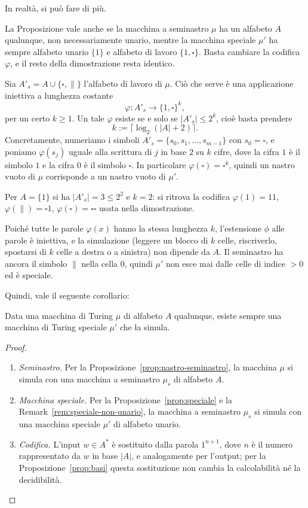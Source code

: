 In realtà, si può fare di più.

\begin{rema}\label{rem:speciale-non-unario}
La Proposizione vale anche se la macchina a seminastro $\mu$ ha un alfabeto $A$ qualunque, non necessariamente unario, mentre la macchina speciale $\mu'$ ha sempre alfabeto unario $\{1\}$ e alfabeto di lavoro $\{1,\square\}$. Basta cambiare la codifica $\varphi$, e il resto della dimostrazione resta identico.

Sia $A'_s=A\cup\{\square,\|\}$ l'alfabeto di lavoro di $\mu$. Ciò che serve è una applicazione iniettiva a lunghezza costante
\[
\varphi:A'_s\to\{1,\square\}^k ,
\]
per un certo $k\geq 1$. Un tale $\varphi$ esiste se e solo se $|A'_s|\leq 2^k$, cioè basta prendere
\[
k:=\lceil\log_2(|A|+2)\rceil .
\]
Concretamente, numeriamo i simboli $A'_s=\{s_0,s_1,\dots,s_{m-1}\}$ con $s_0=\square$, e poniamo $\varphi(s_j)$ uguale alla scrittura di $j$ in base $2$ su $k$ cifre, dove la cifra $1$ è il simbolo $1$ e la cifra $0$ è il simbolo $\square$. In particolare $\varphi(\square)=\square^k$, quindi un nastro vuoto di $\mu$ corrisponde a un nastro vuoto di $\mu'$.

Per $A=\{1\}$ si ha $|A'_s|=3\leq 2^2$ e $k=2$: si ritrova la codifica $\varphi(1)=11$, $\varphi(\|)=\square 1$, $\varphi(\square)=\square\square$ usata nella dimostrazione.

Poiché tutte le parole $\varphi(x)$ hanno la stessa lunghezza $k$, l'estensione $\phi$ alle parole è iniettiva, e la simulazione (leggere un blocco di $k$ celle, riscriverlo, spostarsi di $k$ celle a destra o a sinistra) non dipende da $A$. Il seminastro ha ancora il simbolo $\|$ nella cella $0$, quindi $\mu'$ non esce mai dalle celle di indice $>0$ ed è speciale.
\end{rema}
Quindi, vale il seguente corollario:
\begin{coro}
Data una macchina di Turing $\mu$ di alfabeto $A$ 
qualunque, esiste sempre una macchina di Turing speciale
$\mu'$ che la simula.
\begin{proof}\
\begin{enumerate}
\item[1.] \emph{Seminastro.} Per la Proposizione~\ref{prop:nastro-seminastro}, la macchina $\mu$ si simula con una macchina a seminastro $\mu_s$ di alfabeto $A$.
\item[2.] \emph{Macchina speciale.} Per la Proposizione~\ref{prop:speciale} e la Remark~\ref{rem:speciale-non-unario}, la macchina a seminastro $\mu_s$ si simula con una macchina speciale $\mu'$ di alfabeto unario.
\item[3.] \emph{Codifica.} L'input $w\in A^*$ è sostituito dalla parola $1^{n+1}$, dove $n$ è il numero rappresentato da $w$ in base $|A|$, e analogamente per l'output; per la Proposizione~\ref{prop:basi} questa sostituzione non cambia la calcolabilità né la decidibilità.
\end{enumerate}
\end{proof}
\end{coro}





